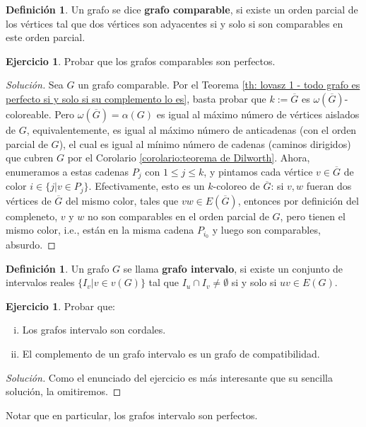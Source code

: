 \documentclass[12pt]{report}
\theoremstyle{plain}
\theoremstyle{definition}
\newtheorem{definition}[theorem]{Definición}
\newtheorem{exercise}[theorem]{Ejercicio}
\newenvironment{solution}{\begin{proof}[Solución]}{\end{proof}}
\renewcommand{\bar}[1]{\overline{#1}}
\begin{document}
\begin{definition}
Un grafo se dice \textbf{grafo comparable}, si existe un orden parcial de los vértices tal que dos vértices son adyacentes si y solo si son comparables en este orden parcial.
\end{definition}
\begin{exercise}
Probar que los grafos comparables son perfectos.
\end{exercise}
\begin{solution}
Sea $G$ un grafo comparable. Por el Teorema \ref{th: lovasz 1 - todo grafo es perfecto si y solo si su complemento lo es}, basta probar que $k:= \bar G$ es $\omega (\bar G)$-coloreable. Pero $\omega (\bar G) = \alpha (G)$ es igual al máximo número de vértices aislados de $G$, equivalentemente, es igual al máximo número de anticadenas (con el orden parcial de $G$), el cual es igual al mínimo número de cadenas (caminos dirigidos) que cubren $G$ por el Corolario \ref{corolario:teorema de Dilworth}. Ahora, enumeramos a estas cadenas $P_j$ con $1 \leq j \leq k$, y pintamos cada vértice $v \in \bar G$ de color $i \in \{j | v \in P_j\}$. Efectivamente, esto es un $k$-coloreo de $\bar G$: si $v,w$ fueran dos vértices de $\bar G$ del mismo color, tales que $vw \in E(\bar G)$, entonces por definición del compleneto, $v$ y $w$ no son comparables en el orden parcial de $G$, pero tienen el mismo color, i.e., están en la misma cadena $P_{i_0}$ y luego son comparables, absurdo.
\end{solution}

\begin{definition}
Un grafo $G$ se llama \textbf{grafo intervalo}, si existe un conjunto de intervalos reales $\{I_v | v \in v(G) \}$ tal que $I_u \cap I_v \neq \emptyset$ si y solo si $uv \in E(G)$.
\end{definition}

\begin{exercise}
 Probar que:
\begin{enumerate}[(i)]
\item Los grafos intervalo son cordales.
\item El complemento de un grafo intervalo es un grafo de compatibilidad.
\end{enumerate}
\end{exercise}
\begin{solution}
Como el enunciado del ejercicio es más interesante que su sencilla solución, la omitiremos.
\end{solution}
Notar que en particular, los grafos intervalo son perfectos.
\end{document}
